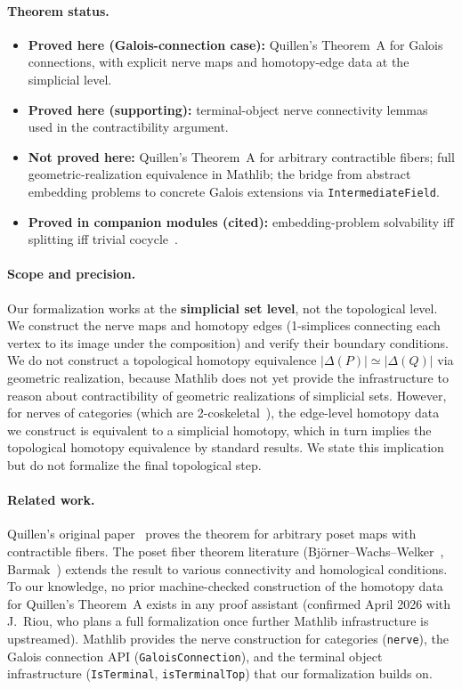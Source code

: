 \documentclass[11pt]{article}
\begin{document}
\paragraph{Theorem status.}
\begin{itemize}[leftmargin=2em]
  \item \textbf{Proved here (Galois-connection case):} Quillen's Theorem~A for Galois
    connections, with explicit nerve maps and homotopy-edge data at the simplicial level.
  \item \textbf{Proved here (supporting):} terminal-object nerve connectivity lemmas used in
    the contractibility argument.
  \item \textbf{Not proved here:} Quillen's Theorem~A for arbitrary contractible fibers; full
    geometric-realization equivalence in Mathlib; the bridge from abstract embedding
    problems to concrete Galois extensions via \texttt{IntermediateField}.
  \item \textbf{Proved in companion modules (cited):} embedding-problem solvability iff
    splitting iff trivial cocycle~\cite{SpivackFiber}.
\end{itemize}

\paragraph{Scope and precision.}
Our formalization works at the \textbf{simplicial set level}, not the
topological level. We construct the nerve maps and homotopy edges (1-simplices
connecting each vertex to its image under the composition) and verify their
boundary conditions. We do not construct a topological homotopy equivalence
$|{\Delta(P)}| \simeq |{\Delta(Q)}|$ via geometric realization, because
Mathlib does not yet provide the infrastructure to reason about contractibility
of geometric realizations of simplicial sets. However, for nerves of categories
(which are 2-coskeletal~\cite{Mathlib}), the edge-level homotopy data we
construct is equivalent to a simplicial homotopy, which in turn implies the
topological homotopy equivalence by standard results. We state this implication
but do not formalize the final topological step.

\paragraph{Related work.}
Quillen's original paper~\cite{Quillen1978} proves the theorem for arbitrary
poset maps with contractible fibers. The poset fiber theorem literature
(Bj\"orner--Wachs--Welker~\cite{BWW2004}, Barmak~\cite{Barmak2010}) extends
the result to various connectivity and homological conditions. To our
knowledge, no prior machine-checked construction of the homotopy data for Quillen's Theorem~A
exists in any proof assistant (confirmed April 2026 with J.~Riou, who plans a full formalization once further
Mathlib infrastructure is upstreamed). Mathlib provides the nerve construction for categories
(\texttt{nerve}), the Galois connection API (\texttt{GaloisConnection}), and
the terminal object infrastructure (\texttt{IsTerminal}, \texttt{isTerminalTop})
that our formalization builds on.
\end{document}
